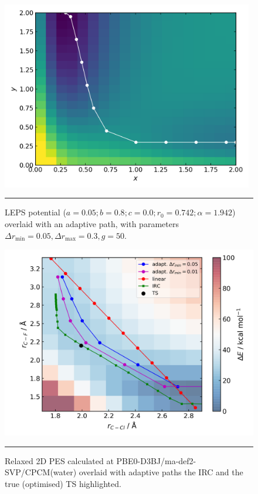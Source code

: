 \documentclass[../../main.tex]{subfiles}
\begin{document}
\begin{figure}[h!]
	\vspace{0.4cm}
	\centering
	\includegraphics[width=11cm]{5/further/figs/fig2/fig2.png}
	\vspace{0.2cm}
	\hrule
	\caption{LEPS potential ($a = 0.05;
		b = 0.8;
		c = 0.0;
		r_0 = 0.742;
		\alpha = 1.942$) overlaid with an adaptive path, with parameters
		$\Delta r_\text{min} = 0.05, \Delta r_\text{max} = 0.3, g = 50$.}
	\label{fig::ade_further_2}
\end{figure}



\begin{figure}[h!]
	\vspace{0.4cm}
	\centering
	\includegraphics[width=12cm]{5/further/figs/fig3/fig3.png}
	\vspace{0.2cm}
	\hrule
	\caption{Relaxed 2D PES calculated at PBE0-D3BJ/ma-def2-SVP/CPCM(water) overlaid with adaptive paths the IRC and the true (optimised) TS highlighted.}
	\label{fig::ade_further_3}
\end{figure}
\end{document}
